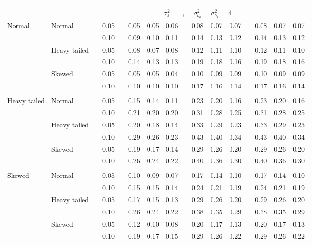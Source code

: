 \documentclass{article} %
\begin{document}
\begin{table}[ht]
\begin{scriptsize}
\begin{center}
\begin{tabular}{ll p{.1cm} c p{.1cm} rrr p{.1cm} rrr p{.1cm} rrr}
&&&&&&&&&&&&&&&\\
& && && \multicolumn{9}{c}{$\sigma_{\varepsilon}^2 = 1$, \ \ $\sigma_{b_0}^2 = \sigma_{b_1}^2 = 4$} \\ \cline{6-16}
Normal       & Normal       && 0.05 &&  0.05 & 0.05 & 0.06 && 0.08 & 0.07 & 0.07 && 0.08 & 0.07 & 0.07 \\ 
             &              && 0.10 &&  0.09 & 0.10 & 0.11 && 0.14 & 0.13 & 0.12 && 0.14 & 0.13 & 0.12 \\ 
             & Heavy tailed && 0.05 &&  0.08 & 0.07 & 0.08 && 0.12 & 0.11 & 0.10 && 0.12 & 0.11 & 0.10 \\ 
             &              && 0.10 &&  0.14 & 0.13 & 0.13 && 0.19 & 0.18 & 0.16 && 0.19 & 0.18 & 0.16 \\ 
             & Skewed       && 0.05 &&  0.05 & 0.05 & 0.04 && 0.10 & 0.09 & 0.09 && 0.10 & 0.09 & 0.09 \\ 
             &              && 0.10 &&  0.10 & 0.10 & 0.10 && 0.17 & 0.16 & 0.14 && 0.17 & 0.16 & 0.14 \\
             &&&&&&&&&&&&&&&\\ 
Heavy tailed & Normal       && 0.05 &&  0.15 & 0.14 & 0.11 && 0.23 & 0.20 & 0.16 && 0.23 & 0.20 & 0.16 \\ 
             &              && 0.10 &&  0.21 & 0.20 & 0.20 && 0.31 & 0.28 & 0.25 && 0.31 & 0.28 & 0.25 \\ 
             & Heavy tailed && 0.05 &&  0.20 & 0.18 & 0.14 && 0.33 & 0.29 & 0.23 && 0.33 & 0.29 & 0.23 \\ 
             &              && 0.10 &&  0.29 & 0.26 & 0.23 && 0.43 & 0.40 & 0.34 && 0.43 & 0.40 & 0.34 \\ 
             & Skewed       && 0.05 &&  0.19 & 0.17 & 0.14 && 0.29 & 0.26 & 0.20 && 0.29 & 0.26 & 0.20 \\ 
             &              && 0.10 &&  0.26 & 0.24 & 0.22 && 0.40 & 0.36 & 0.30 && 0.40 & 0.36 & 0.30 \\ 
             &&&&&&&&&&&&&&&\\
Skewed       & Normal       && 0.05 &&  0.10 & 0.09 & 0.07 && 0.17 & 0.14 & 0.10 && 0.17 & 0.14 & 0.10 \\ 
             &              && 0.10 &&  0.15 & 0.15 & 0.14 && 0.24 & 0.21 & 0.19 && 0.24 & 0.21 & 0.19 \\ 
             & Heavy tailed && 0.05 &&  0.17 & 0.15 & 0.13 && 0.29 & 0.26 & 0.20 && 0.29 & 0.26 & 0.20 \\ 
             &              && 0.10 &&  0.26 & 0.24 & 0.22 && 0.38 & 0.35 & 0.29 && 0.38 & 0.35 & 0.29 \\ 
             & Skewed       && 0.05 &&  0.12 & 0.10 & 0.08 && 0.20 & 0.17 & 0.13 && 0.20 & 0.17 & 0.13 \\ 
             &              && 0.10 &&  0.19 & 0.17 & 0.15 && 0.29 & 0.26 & 0.22 && 0.29 & 0.26 & 0.22 \\ 


\end{tabular}
\end{center}
\end{scriptsize}
\end{table}
\end{document}
